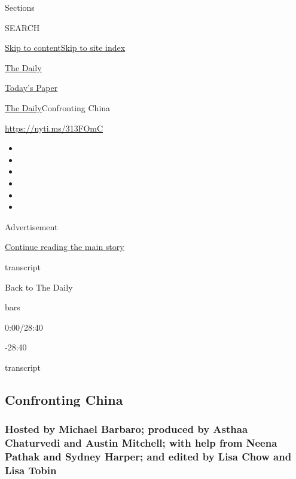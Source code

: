 Sections

SEARCH

\protect\hyperlink{site-content}{Skip to
content}\protect\hyperlink{site-index}{Skip to site index}

\href{https://www.nytimes3xbfgragh.onion/podcasts/the-daily}{The Daily}

\href{https://myaccount.nytimes3xbfgragh.onion/auth/login?response_type=cookie\&client_id=vi}{}

\href{https://www.nytimes3xbfgragh.onion/section/todayspaper}{Today's
Paper}

\href{/podcasts/the-daily}{The Daily}\textbar{}Confronting China

\url{https://nyti.ms/313FOmC}

\begin{itemize}
\item
\item
\item
\item
\item
\item
\end{itemize}

Advertisement

\protect\hyperlink{after-top}{Continue reading the main story}

transcript

Back to The Daily

bars

0:00/28:40

-28:40

transcript

\hypertarget{confronting-china}{%
\subsection{Confronting China}\label{confronting-china}}

\hypertarget{hosted-by-michael-barbaro-produced-by-asthaa-chaturvedi-and-austin-mitchell-with-help-from-neena-pathak-and-sydney-harper-and-edited-by-lisa-chow-and-lisa-tobin}{%
\subsubsection{Hosted by Michael Barbaro; produced by Asthaa Chaturvedi
and Austin Mitchell; with help from Neena Pathak and Sydney Harper; and
edited by Lisa Chow and Lisa
Tobin}\label{hosted-by-michael-barbaro-produced-by-asthaa-chaturvedi-and-austin-mitchell-with-help-from-neena-pathak-and-sydney-harper-and-edited-by-lisa-chow-and-lisa-tobin}}

